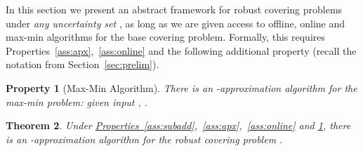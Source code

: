 \documentclass[11pt,letterpaper]{article}
\newcommand{\lref}[2][]{\hyperref[#2]{#1~\ref*{#2}}}
\newtheorem{theorem}{Theorem}[section]
\newtheorem{property}[theorem]{Property}
\begin{document}
In this section we present an abstract framework for robust covering problems under {\em any uncertainty set} ,
as long as we are given access to offline, online and max-min algorithms for the base covering problem. Formally, this
requires Properties~\ref{ass:apx},~\ref{ass:online} and the following additional property (recall the notation from
Section~\ref{sec:prelim}).
\begin{property}[Max-Min Algorithm]\label{ass:maxmin}
  There is an -approximation algorithm for the max-min problem:
  given input , .
\end{property}

\begin{theorem}\label{th:gen-p-sets}
Under \lref[Properties]{ass:subadd},~\ref{ass:apx},~\ref{ass:online} and \ref{ass:maxmin}, there is an
-approximation algorithm for the robust covering problem .
\end{theorem}
\end{document}
